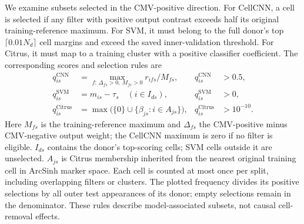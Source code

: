 We examine subsets selected in the CMV-positive direction. For CellCNN, a cell is selected
if any filter with positive output contrast exceeds half its original
training-reference maximum. For SVM, it must belong to the full donor's top
$\lceil 0.01N_d\rceil$ cell margins and exceed the saved inner-validation
threshold. For Citrus, it must map to a training cluster with a positive
classifier coefficient. The corresponding scores and selection rules are
\[
\begin{aligned}
q^{\mathrm{CNN}}_{is}
  &= \max_{f:\,\Delta_{fs}>0,\ M_{fs}>0} r_{ifs}/M_{fs},
  &q^{\mathrm{CNN}}_{is}&>0.5,\\
q^{\mathrm{SVM}}_{is}
  &= m_{is}-\tau_s\quad(i\in I_{ds}),
  &q^{\mathrm{SVM}}_{is}&>0,\\
q^{\mathrm{Citrus}}_{is}
  &= \max\bigl(\{0\}\cup\{\beta_{js}:i\in A_{js}\}\bigr),
  &q^{\mathrm{Citrus}}_{is}&>10^{-10}.
\end{aligned}
\]
Here $M_{fs}$ is the training-reference maximum and $\Delta_{fs}$ the
CMV-positive minus CMV-negative output weight; the CellCNN maximum is zero
if no filter is eligible. $I_{ds}$ contains the donor's top-scoring cells;
SVM cells outside it are unselected. $A_{js}$ is Citrus membership inherited
from the nearest original training cell in ArcSinh marker space.
Each cell is counted at most once per split, including overlapping filters
or clusters. The plotted frequency divides its positive selections by all
outer test appearances of its donor; empty selections remain in the
denominator. These rules describe model-associated subsets, not causal
cell-removal effects.
